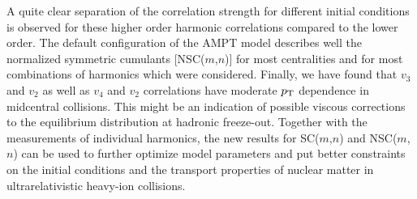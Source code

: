 A quite clear separation of the correlation strength for different initial conditions is observed for these higher order harmonic correlations compared to the lower order.
The default configuration of the AMPT model describes well the normalized symmetric cumulants [NSC($m$,$n$)] for most centralities and for most combinations of harmonics which were considered. 
Finally, we have found that $v_3$ and $v_2$ as well as $v_4$ and $v_2$ correlations have moderate $p_{\rm T}$ dependence in midcentral collisions. This might be an indication of possible viscous corrections to the equilibrium distribution at hadronic freeze-out.
Together with the measurements of individual harmonics, the new results for SC($m$,$n$) and NSC($m$,$n$) can be used to further optimize model parameters and put better constraints on the initial conditions and the transport properties of nuclear matter in ultrarelativistic heavy-ion collisions.






